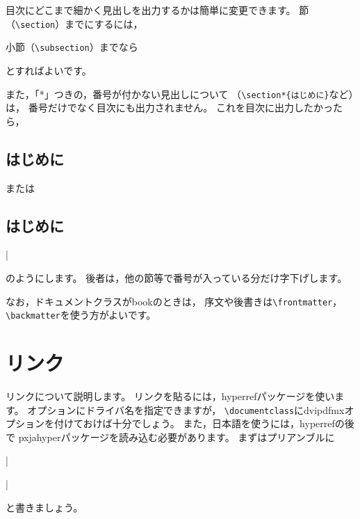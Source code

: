 目次にどこまで細かく見出しを出力するかは簡単に変更できます。
節（\verb|\section|）までにするには，
\begin{ITeX}
\setcounter{tocdepth}{1}
\end{ITeX}
小節（\verb|\subsection|）までなら
\begin{ITeX}
\setcounter{tocdepth}{2}
\end{ITeX}
とすればよいです。

また，「*」つきの，番号が付かない見出しについて
（\verb|\section*{はじめに}|など）は，
番号だけでなく目次にも出力されません。
これを目次に出力したかったら，
\begin{ITeX}
\section*{はじめに}
\end{ITeX}
または
\begin{ITeX}
\section*{はじめに}|
\end{ITeX}
のようにします。
後者は，他の節等で番号が入っている分だけ字下げします。

なお，ドキュメントクラスがbookのときは，
序文や後書きは\verb|\frontmatter|，\verb|\backmatter|を使う方がよいです。



\section{リンク}
リンクについて説明します。
リンクを貼るには，hyperrefパッケージを使います。
オプションにドライバ名を指定できますが，
\verb|\documentclass|にdvipdfmxオプションを付けておけば十分でしょう。
また，日本語を使うには，hyperrefの後で
pxjahyperパッケージを読み込む必要があります。
まずはプリアンブルに
\begin{ITeX}
\usepackage{hyperref}|
\usepackage{pxjahyper}|
\end{ITeX}
と書きましょう。



